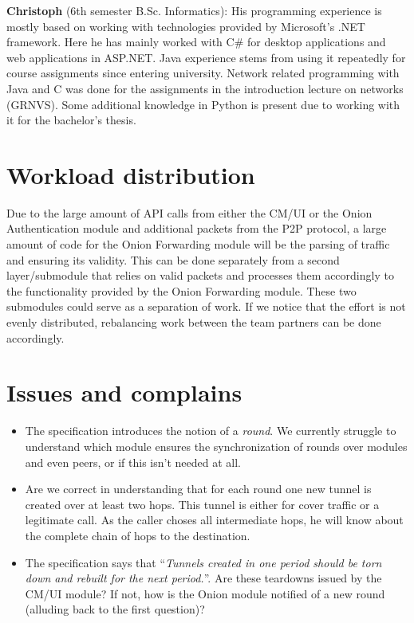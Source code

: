 \documentclass[paper=letter, fontsize=12pt]{article}
\begin{document}
\textbf{Christoph} (6th semester B.Sc. Informatics): His programming experience is mostly based on working with technologies provided by Microsoft's .NET framework. Here he has mainly worked with C\# for desktop applications and web applications in ASP.NET. Java experience stems from using it repeatedly for course assignments since entering university. Network related programming with Java and C was done for the assignments in the introduction lecture on networks (GRNVS). Some additional knowledge in Python is present due to working with it for the bachelor's thesis.

\section{Workload distribution}
Due to the large amount of API calls from either the CM/UI or the Onion Authentication module and additional packets from the P2P protocol, a large amount of code for the Onion Forwarding module will be the parsing of traffic and ensuring its validity. This can be done separately from a second layer/submodule that relies on valid packets and processes them accordingly to the functionality provided by the Onion Forwarding module. These two submodules could serve as a separation of work. If we notice that the effort is not evenly distributed, rebalancing work between the team partners can be done accordingly.

\section{Issues and complains}
\begin{itemize}
\item The specification introduces the notion of a \emph{round}. We currently struggle to understand which module ensures the synchronization of rounds over modules and even peers, or if this isn't needed at all.

\item Are we correct in understanding that for each round one new tunnel is created over at least two hops. This tunnel is either for cover traffic or a legitimate call. As the caller choses all intermediate hops, he will know about the complete chain of hops to the destination. 

\item The specification says that \enquote{\emph{Tunnels created in one period should be torn down and rebuilt for the next period.}}. Are these teardowns issued by the CM/UI module? If not, how is the Onion module notified of a new round (alluding back to the first question)?
\end{itemize}

\end{document}
